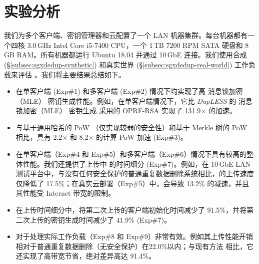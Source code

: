 \section{实验分析}
\label{sec:sgxdedup-evaluation}

我们为多个客户端、密钥管理器和云配置了一个 LAN 机器集群。每台机器都有一个四核 3.0\,GHz Intel Core i5-7400 CPU，一个 1\,TB 7200 RPM SATA 硬盘和 8\,GB RAM。所有机器都运行 Ubuntu 18.04 并通过 10\,GbE 连接。我们使用合成 (\S\ref{subsec:sgxdedup-synthetic}) 和真实世界 (\S\ref{subsec:sgxdedup-real-world}) 工作负载来评估 \sysnameS。我们将主要结果总结如下。

\begin{itemize}[leftmargin=*]
\item \sysnameS 在单客户端 (Exp\#1) 和多客户端 (Exp\#2) 情况下均实现了高 消息锁加密（MLE） 密钥生成性能。例如，在单客户端情况下，它比 {\em DupLESS} 的 消息锁加密（MLE） 密钥生成 \cite{bellare13b} 采用的 OPRF-RSA 实现了 131.9$\times$ 的加速。
\item \sysnameS 与基于通用哈希的 PoW \cite{xu13}（仅实现较弱的安全性）和基于 Merkle 树的 PoW \cite{halevi11} 相比，具有 2.2$\times$ 和 8.2$\times$ 的计算 PoW 加速 (Exp\#3)。
\item \sysnameS 在单客户端（Exp\#4 和 Exp\#5）和多客户端（Exp\#6）情况下具有较高的整体性能。我们还提供了上传中 \sysnameS 的时间细分 (Exp\#7)。例如，在 10\,GbE LAN 测试平台中，与没有任何安全保护的普通重复数据删除系统相比，\sysnameS 的上传速度仅降低了 17.5\%；在真实云部署（Exp\#5）中，\sysnameS 会导致 13.2\% 的减速，并且其性能受 Internet 带宽的限制。
\item 在上传时间细分中，\sysnameS 将第二次上传的客户端初始化时间减少了 91.5\%，并将第二次上传的密钥生成时间减少了 41.9\% (Exp\#7)。
\item \sysnameS 对于处理实际工作负载（Exp\#8 和 Exp\#9）非常有效。例如其上传性能开销相对于普通重复数据删除（无安全保护）在22.0\%以内；与现有方法 \cite{li15,harnik10} 相比，它还实现了高带宽节省，绝对差异高达 91.4\%。
\end{itemize}


